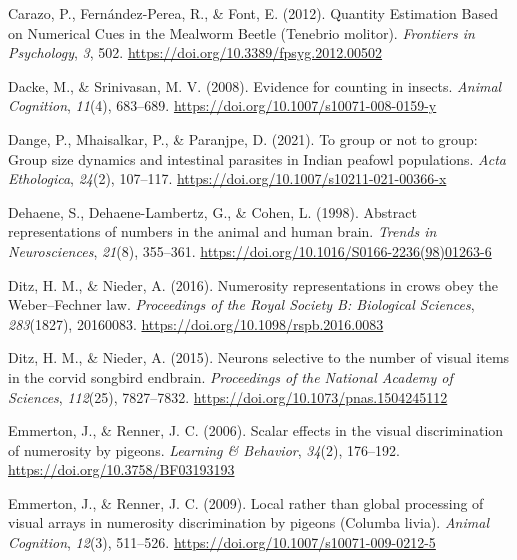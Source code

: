 \documentclass[
  ,doc,floatsintext]{apa6}
\newlength{\cslhangindent}
\newlength{\cslentryspacingunit} %
\newenvironment{CSLReferences}[2] %
 {%
  \setlength{\parindent}{0pt}
  \ifodd #1
  \let\oldpar\par
  \def\par{\hangindent=\cslhangindent\oldpar}
  \fi
  \setlength{\parskip}{#2\cslentryspacingunit}
 }%
 {}
\begin{document}
\begin{CSLReferences}{1}{0}
\leavevmode{}%
Carazo, P., Fernández-Perea, R., \& Font, E. (2012). Quantity {Estimation} {Based} on {Numerical} {Cues} in the {Mealworm} {Beetle} ({Tenebrio} molitor). \emph{Frontiers in Psychology}, \emph{3}, 502. \url{https://doi.org/10.3389/fpsyg.2012.00502}

\leavevmode{}%
Dacke, M., \& Srinivasan, M. V. (2008). Evidence for counting in insects. \emph{Animal Cognition}, \emph{11}(4), 683--689. \url{https://doi.org/10.1007/s10071-008-0159-y}

\leavevmode{}%
Dange, P., Mhaisalkar, P., \& Paranjpe, D. (2021). To group or not to group: Group size dynamics and intestinal parasites in {Indian} peafowl populations. \emph{Acta Ethologica}, \emph{24}(2), 107--117. \url{https://doi.org/10.1007/s10211-021-00366-x}

\leavevmode{}%
Dehaene, S., Dehaene-Lambertz, G., \& Cohen, L. (1998). Abstract representations of numbers in the animal and human brain. \emph{Trends in Neurosciences}, \emph{21}(8), 355--361. \url{https://doi.org/10.1016/S0166-2236(98)01263-6}

\leavevmode{}%
Ditz, H. M., \& Nieder, A. (2016). Numerosity representations in crows obey the {Weber}--{Fechner} law. \emph{Proceedings of the Royal Society B: Biological Sciences}, \emph{283}(1827), 20160083. \url{https://doi.org/10.1098/rspb.2016.0083}

\leavevmode{}%
Ditz, H. M., \& Nieder, A. (2015). Neurons selective to the number of visual items in the corvid songbird endbrain. \emph{Proceedings of the National Academy of Sciences}, \emph{112}(25), 7827--7832. \url{https://doi.org/10.1073/pnas.1504245112}

\leavevmode{}%
Emmerton, J., \& Renner, J. C. (2006). Scalar effects in the visual discrimination of numerosity by pigeons. \emph{Learning \& Behavior}, \emph{34}(2), 176--192. \url{https://doi.org/10.3758/BF03193193}

\leavevmode{}%
Emmerton, J., \& Renner, J. C. (2009). Local rather than global processing of visual arrays in numerosity discrimination by pigeons ({Columba} livia). \emph{Animal Cognition}, \emph{12}(3), 511--526. \url{https://doi.org/10.1007/s10071-009-0212-5}


\end{CSLReferences}
\end{document}
